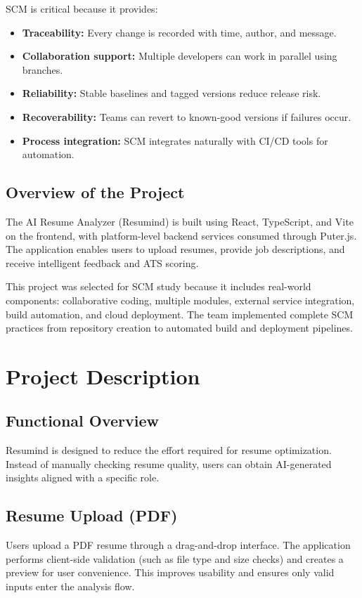 \documentclass[12pt,a4paper]{report}
\begin{document}
SCM is critical because it provides:
\begin{itemize}[leftmargin=1.2cm]
    \item \textbf{Traceability:} Every change is recorded with time, author, and message.
    \item \textbf{Collaboration support:} Multiple developers can work in parallel using branches.
    \item \textbf{Reliability:} Stable baselines and tagged versions reduce release risk.
    \item \textbf{Recoverability:} Teams can revert to known-good versions if failures occur.
    \item \textbf{Process integration:} SCM integrates naturally with CI/CD tools for automation.
\end{itemize}

\section{Overview of the Project}
The AI Resume Analyzer (Resumind) is built using React, TypeScript, and Vite on the frontend, with platform-level backend services consumed through Puter.js. The application enables users to upload resumes, provide job descriptions, and receive intelligent feedback and ATS scoring.

This project was selected for SCM study because it includes real-world components: collaborative coding, multiple modules, external service integration, build automation, and cloud deployment. The team implemented complete SCM practices from repository creation to automated build and deployment pipelines.

\chapter{Project Description}
\section{Functional Overview}
Resumind is designed to reduce the effort required for resume optimization. Instead of manually checking resume quality, users can obtain AI-generated insights aligned with a specific role.

\section{Resume Upload (PDF)}
Users upload a PDF resume through a drag-and-drop interface. The application performs client-side validation (such as file type and size checks) and creates a preview for user convenience. This improves usability and ensures only valid inputs enter the analysis flow.
\end{document}
